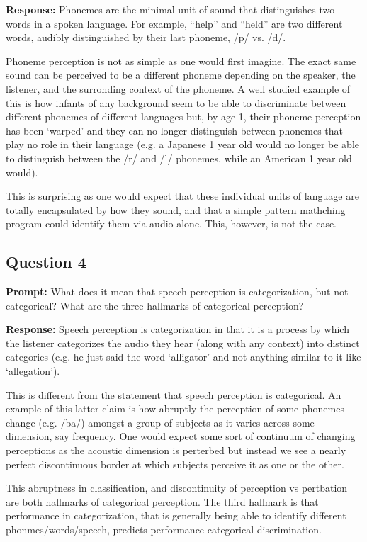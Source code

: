 \documentclass{article}
\begin{document}
\noindent\textbf{Response:} Phonemes are the minimal unit of sound that distinguishes two words in a spoken language. For example, ``help'' and ``held'' are two different words, audibly distinguished by their last phoneme, /p/ vs. /d/.

Phoneme perception is not as simple as one would first imagine. The exact same sound can be perceived to be a different phoneme depending on the speaker, the listener, and the surronding context of the phoneme. A well studied example of this is how infants of any background seem to be able to discriminate between different phonemes of different languages but, by age 1, their phoneme perception has been `warped' and they can no longer distinguish between phonemes that play no role in their language (e.g. a Japanese 1 year old would no longer be able to distinguish between the /r/ and /l/ phonemes, while an American 1 year old would).

This is surprising as one would expect that these individual units of language are totally encapsulated by how they sound, and that a simple pattern mathching program could identify them via audio alone. This, however, is not the case. 

\subsection*{Question 4}
\noindent\textbf{Prompt:} What does it mean that speech perception is categorization, but not categorical? What are the three hallmarks of categorical perception?
\bigskip

\noindent\textbf{Response:} Speech perception is categorization in that it is a process by which the listener categorizes the audio they hear (along with any context) into distinct categories (e.g. he just said the word `alligator' and not anything similar to it like `allegation').

This is different from the statement that speech perception is categorical. An example of this latter claim is how abruptly the perception of some phonemes change (e.g. /ba/) amongst a group of subjects as it varies across some dimension, say frequency. One would expect some sort of continuum of changing perceptions as the acoustic dimension is perterbed but instead we see a nearly perfect discontinuous border at which subjects perceive it as one or the other.

This abruptness in classification, and discontinuity of perception vs pertbation are both hallmarks of categorical perception. The third hallmark is that performance in categorization, that is generally being able to identify different phonmes/words/speech, predicts performance categorical discrimination.
\end{document}
